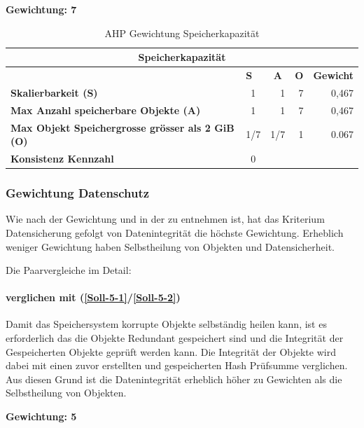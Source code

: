 \textbf{Gewichtung: 7}

\begin{table}[htbp]
\caption{AHP Gewichtung Speicherkapazität}
\begin{tabular}{|l|c|c|c|l|}
\hline
\multicolumn{ 5}{|c|}{\textbf{Speicherkapazität}} \\ \hline
 & \multicolumn{1}{l|}{\textbf{S}} & \textbf{A} & \textbf{O} & \textbf{Gewicht} \\ \hline
\textbf{Skalierbarkeit (S)} & 1 & \multicolumn{1}{r|}{1} & \multicolumn{1}{r|}{7} & \multicolumn{1}{r|}{0,467} \\ \hline
\textbf{Max Anzahl speicherbare Objekte (A)} & 1 & \multicolumn{1}{r|}{1} & \multicolumn{1}{r|}{7} & \multicolumn{1}{r|}{0,467} \\ \hline
\textbf{Max Objekt Speichergrosse grösser als 2 GiB (O)} & 1/7 & \multicolumn{1}{r|}{1/7} & \multicolumn{1}{r|}{1} & \multicolumn{1}{r|}{0.067} \\ \hline
\textbf{Konsistenz Kennzahl} & 0 \\ \cline{1-2}
\end{tabular}
\label{tab:AHPSpeicherkapazität}
\end{table}

\subsubsection{Gewichtung Datenschutz}

Wie nach der Gewichtung und in der  zu entnehmen ist, hat das Kriterium Datensicherung gefolgt von Datenintegrität die höchste Gewichtung. Erheblich weniger Gewichtung haben Selbstheilung von Objekten und Datensicherheit.

Die Paarvergleiche im Detail:


\paragraph*{ verglichen mit  (\ref{Soll-5-1}/\ref{Soll-5-2})}
Damit das Speichersystem korrupte Objekte selbständig heilen kann, ist es erforderlich das die Objekte Redundant gespeichert sind und die Integrität der Gespeicherten Objekte geprüft werden kann. Die Integrität der Objekte wird dabei mit einen zuvor erstellten und gespeicherten Hash Prüfsumme verglichen. Aus diesen Grund ist die Datenintegrität erheblich höher zu Gewichten als die Selbstheilung von Objekten.

\textbf{Gewichtung: 5}

